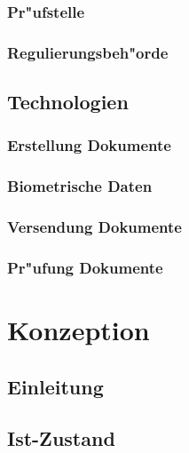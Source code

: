 \documentclass[a4paper, 12pt]{article}
\begin{document}
\subsubsection{Pr"ufstelle}
\label{sec:Pr"ufstelle}


\subsubsection{Regulierungsbeh"orde}
\label{sec:Regulierungsbeh"orde}


\subsection{Technologien}
\label{sec:Technologien}


\subsubsection{Erstellung Dokumente}
\label{sec:Erstellung Dokumente}


\subsubsection{Biometrische Daten}
\label{sec:Biometrische Daten}


\subsubsection{Versendung Dokumente}
\label{sec:Versendung Dokumente}


\subsubsection{Pr"ufung Dokumente}
\label{sec:Pr"ufung Dokumente}

\section{Konzeption}
\label{sec:Konzeption}
%

\subsection{Einleitung}
\label{sec:EinleitungKon}


\subsection{Ist-Zustand}
\label{sec:Ist-Zustand}

\end{document}
